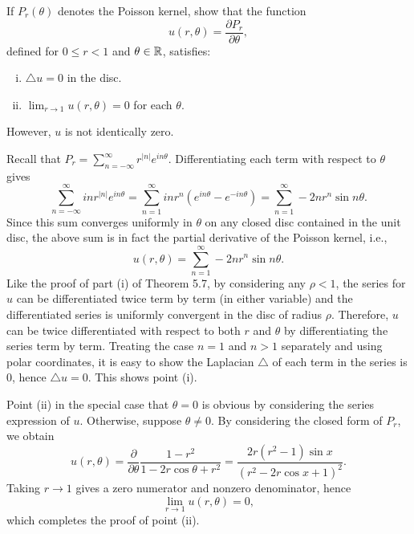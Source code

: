 \begin{exrc}[18]
    If \(P_r(\theta)\) denotes the Poisson kernel, show that the function
    \begin{equation*}
        u(r, \theta) = \frac{\partial P_r}{\partial \theta},
    \end{equation*}
    defined for \(0 \leq r < 1\) and \(\theta \in \mathbb{R}\), satisfies:
    \begin{enumerate}[(i)]
    \item
        \(\bigtriangleup u = 0\) in the disc.
    \item
        \(\lim_{r \to 1} u(r, \theta) = 0\) for each \(\theta\).
    \end{enumerate}
    However, \(u\) is not identically zero.

\begin{soln}
    Recall that \(P_r = \sum_{n = -\infty}^{\infty} r^{|n|} e^{in\theta}\). 
    Differentiating each term with respect to \(\theta\) gives
    \begin{equation*}
        \sum_{n = -\infty}^{\infty} in r^{|n|} e^{in\theta}
        = \sum_{n = 1}^{\infty} inr^n (e^{in\theta} - e^{-in\theta})
        = \sum_{n = 1}^{\infty} -2nr^n \sin n\theta.
    \end{equation*}
    Since this sum converges uniformly in \(\theta\) on any closed disc
    contained in the unit disc,
    the above sum is in fact the partial derivative of the Poisson kernel, i.e.,
    \begin{equation*}
        u(r, \theta) = \sum_{n = 1}^{\infty} -2nr^n \sin n\theta.
    \end{equation*}
    Like the proof of part (i) of Theorem 5.7, by considering any \(\rho < 1\),
    the series for \(u\) can be differentiated twice term by term (in either variable)
    and the differentiated series is uniformly convergent in the disc of radius \(\rho\).
    Therefore, \(u\) can be twice differentiated with respect to both \(r\) and \(\theta\)
    by differentiating the series term by term.
    Treating the case \(n = 1\) and \(n > 1\) separately and using polar coordinates, 
    it is easy to show the Laplacian \(\bigtriangleup\) of each term in the series is 0,
    hence \(\bigtriangleup u = 0\).  This shows point (i).

    Point (ii) in the special case that \(\theta = 0\) is obvious by considering the 
    series expression of \(u\).
    Otherwise, suppose \(\theta \neq 0\).
    By considering the closed form of \(P_r\), we obtain
    \begin{equation*}
        u(r, \theta) = \frac{\partial}{\partial \theta} \frac{1 - r^2}{1 - 2r \cos \theta + r^2}
        = \frac{2r (r^2 - 1) \sin x}{(r^2 - 2r \cos x + 1)^2}.
    \end{equation*}
    Taking \(r \to 1\) gives a zero numerator and nonzero denominator,
    hence 
    \begin{equation*}
        \lim_{r \to 1} u(r, \theta) = 0,
    \end{equation*}
    which completes the proof of point (ii).


\end{soln}
\end{exrc}
